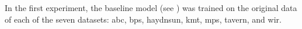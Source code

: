 
In the first experiment, the baseline model (see
) was trained on the original data
of each of the seven datasets: \gls{abc}, \gls{bps},
\gls{haydnsun}, \gls{kmt}, \gls{mps}, \gls{tavern}, and
\gls{wir}.
